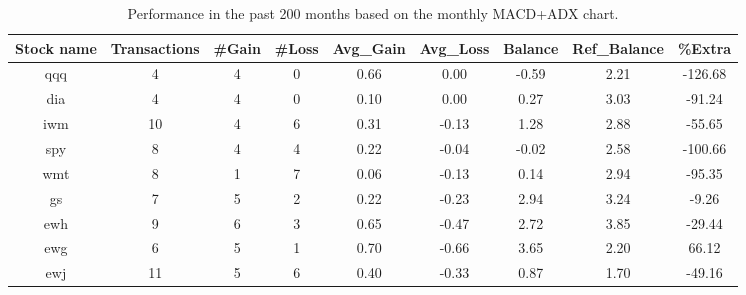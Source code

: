 \begin{table}[H]
\caption{Performance in the past 200 months based on the monthly MACD+ADX chart.}
\label{tab:months}
\begin{center}
\begin{tabular}{ccccccccc}
Stock name & Transactions & \#Gain & \#Loss & Avg\_Gain & Avg\_Loss & Balance & Ref\_Balance & \%Extra\\   
\hline
qqq&4&4&0&0.66&0.00&-0.59&2.21&-126.68\\
dia&4&4&0&0.10&0.00&0.27&3.03&-91.24\\
iwm&10&4&6&0.31&-0.13&1.28&2.88&-55.65\\
spy&8&4&4&0.22&-0.04&-0.02&2.58&-100.66\\
wmt&8&1&7&0.06&-0.13&0.14&2.94&-95.35\\
gs&7&5&2&0.22&-0.23&2.94&3.24&-9.26\\
ewh&9&6&3&0.65&-0.47&2.72&3.85&-29.44\\
ewg&6&5&1&0.70&-0.66&3.65&2.20&66.12\\
ewj&11&5&6&0.40&-0.33&0.87&1.70&-49.16\\
\hline
\end{tabular}
\end{center}
\end{table}
